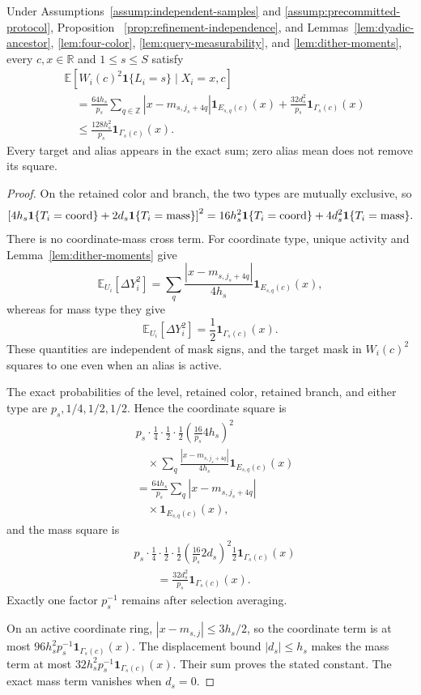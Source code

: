 \begin{lemma}
\label{lem:higher-square}
Under Assumptions~\ref{assump:independent-samples} and
\ref{assump:precommitted-protocol}, Proposition~
\ref{prop:refinement-independence}, and Lemmas~\ref{lem:dyadic-ancestor},
\ref{lem:four-color}, \ref{lem:query-measurability}, and
\ref{lem:dither-moments}, every $c,x\in\mathbb R$ and
$1\leq s\leq S$ satisfy
\[
\begin{aligned}
 &\mathbb E[W_i(c)^2\mathbf1\{L_i=s\}\mid X_i=x,c]\\
 &\quad=\frac{64h_s}{p_s}\sum_{q\in\mathbb Z}
 |x-m_{s,j_s+4q}|\mathbf1_{E_{s,q}(c)}(x)
 +\frac{32d_s^2}{p_s}\mathbf1_{\Gamma_s(c)}(x)\\
 &\quad\leq\frac{128h_s^2}{p_s}\mathbf1_{\Gamma_s(c)}(x).
\end{aligned}
\]
Every target and alias appears in the exact sum; zero alias mean does not
remove its square.
\end{lemma}

\begin{proof}
On the retained color and branch, the two types are mutually exclusive, so
\[
 \left[4h_s\mathbf1\{T_i={\rm coord}\}
 +2d_s\mathbf1\{T_i={\rm mass}\}\right]^2
 =16h_s^2\mathbf1\{T_i={\rm coord}\}
 +4d_s^2\mathbf1\{T_i={\rm mass}\}.
\]
There is no coordinate-mass cross term.  For coordinate type, unique activity
and Lemma~\ref{lem:dither-moments} give
\[
 \mathbb E_{U_i}[\Delta Y_i^2]
 =\sum_q\frac{|x-m_{s,j_s+4q}|}{4h_s}
  \mathbf1_{E_{s,q}(c)}(x),
\]
whereas for mass type they give
\[
 \mathbb E_{U_i}[\Delta Y_i^2]
 =\frac12\mathbf1_{\Gamma_s(c)}(x).
\]
These quantities are independent of mask signs, and the target mask in
$W_i(c)^2$ squares to one even when an alias is active.

The exact probabilities of the level, retained color, retained branch, and
either type are $p_s,1/4,1/2,1/2$.  Hence the coordinate square is
\[
\begin{aligned}
 &p_s\cdot\frac14\cdot\frac12\cdot\frac12
 \left(\frac{16}{p_s}4h_s\right)^2\\[-0.2em]
 &\quad{}\times
 \sum_q\frac{|x-m_{s,j_s+4q}|}{4h_s}
  \mathbf1_{E_{s,q}(c)}(x)\\
 &=\frac{64h_s}{p_s}\sum_q|x-m_{s,j_s+4q}|\\[-0.2em]
 &\quad{}\times\mathbf1_{E_{s,q}(c)}(x),
\end{aligned}
\]
and the mass square is
\[
\begin{aligned}
 &p_s\cdot\frac14\cdot\frac12\cdot\frac12
 \left(\frac{16}{p_s}2d_s\right)^2
 \frac12\mathbf1_{\Gamma_s(c)}(x)\\
 &\qquad=\frac{32d_s^2}{p_s}\mathbf1_{\Gamma_s(c)}(x).
\end{aligned}
\]
Exactly one factor $p_s^{-1}$ remains after selection averaging.

On an active coordinate ring,
$|x-m_{s,j}|\leq3h_s/2$, so the coordinate term is at most
$96h_s^2p_s^{-1}\mathbf1_{\Gamma_s(c)}(x)$.  The displacement bound
$|d_s|\leq h_s$ makes the mass term at most
$32h_s^2p_s^{-1}\mathbf1_{\Gamma_s(c)}(x)$.  Their sum proves the stated
constant.  The exact mass term vanishes when $d_s=0$.
\end{proof}

